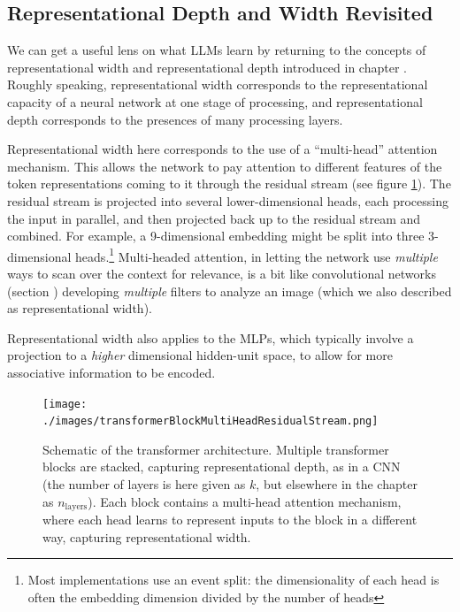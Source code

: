 \subsection{Representational Depth and Width Revisited} 

We can get a useful lens on what LLMs learn by returning to the concepts of
representational width and representational depth introduced in chapter .  Roughly speaking, representational width corresponds to the representational capacity of a neural network at one stage of processing, and representational depth corresponds to the presences of many processing layers.
 
Representational width here corresponds to the use of a
``multi-head'' attention mechanism. This allows the network to pay attention to
different features of the token representations coming to it through the
residual stream (see figure \ref{multipleHeads}). The residual stream is projected into several lower-dimensional heads, each processing the input in parallel, and then projected back up to the residual stream and combined. For example, a 9-dimensional embedding might be split into three 3-dimensional heads.\footnote{Most implementations use an event split: the dimensionality of each head is often the embedding dimension divided by the number of heads}
Multi-headed attention, in letting the
network use \emph{multiple} ways to scan over the context for relevance, is a
bit like convolutional networks (section )
developing \emph{multiple} filters to analyze an image (which we also described as
representational width). 

Representational width also applies to the MLPs, which typically involve a projection to a \emph{higher} dimensional hidden-unit space, to allow for more associative information to be encoded.

\begin{figure}[ht]
\centering
\texttt{[image: ./images/transformerBlockMultiHeadResidualStream.png]}
\caption[Jeff Yoshimi with consultation from Tim Meyer.]{Schematic of the
transformer architecture. Multiple transformer blocks are stacked, capturing
representational depth, as in a CNN (the number of layers is here given as $k$, but elsewhere in the chapter as $n_{\mbox{layers}}$). Each block contains a multi-head attention
mechanism, where each head learns to represent inputs to the block in a
different way, capturing representational width.}
\label{multipleHeads}
\end{figure}
 
